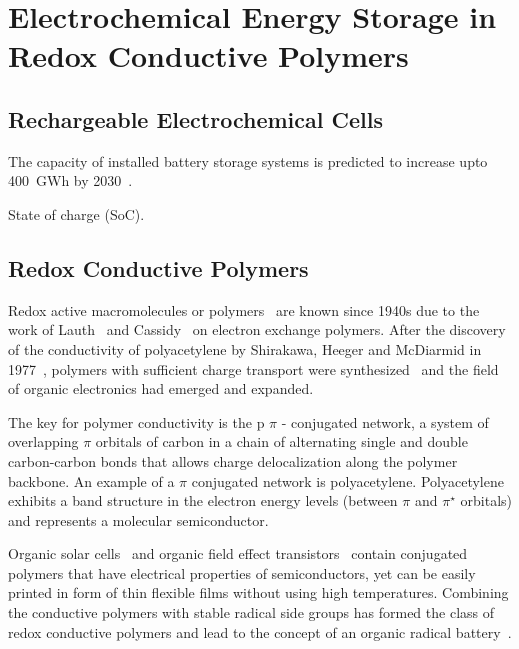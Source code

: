 \chapter{Electrochemical Energy Storage in Redox Conductive Polymers}

\section{Rechargeable Electrochemical Cells}

The capacity of installed battery storage systems is predicted to increase upto 400~GWh by 2030~\cite{Figgener_2020}.

State of charge (SoC).



\section{Redox Conductive Polymers}

Redox active macromolecules or polymers~\cite{Staudinger_1920} are known since 1940s due to the work of Lauth~\cite{Lauth_1944} and Cassidy~\cite{Cassidy_1949} on electron exchange polymers. After the discovery of the conductivity of polyacetylene by Shirakawa, Heeger and McDiarmid in 1977~\cite{Shirakawa_1977}, polymers with sufficient charge transport were synthesized~\cite{} and the field of organic electronics had emerged and expanded. 

\par

The key for polymer conductivity is the p $\pi$ - conjugated network, a system of overlapping $\pi$ orbitals of carbon in a chain of alternating single and double carbon-carbon bonds that allows charge delocalization along the polymer backbone. An example of a $\pi$ conjugated network is polyacetylene. Polyacetylene exhibits a band structure in the electron energy levels (between $\pi$ and $\pi^\star$ orbitals) and represents a molecular semiconductor.

\par

Organic solar cells~\cite{Lee_1993} and organic field effect transistors~\cite{Koezuka_1987} contain conjugated polymers that have electrical properties of semiconductors, yet can be easily printed in form of thin flexible films without using high temperatures. Combining the conductive polymers with stable radical side groups has formed the class of redox conductive polymers and lead to the concept of an organic radical battery~\cite{Rohland_2021}.




